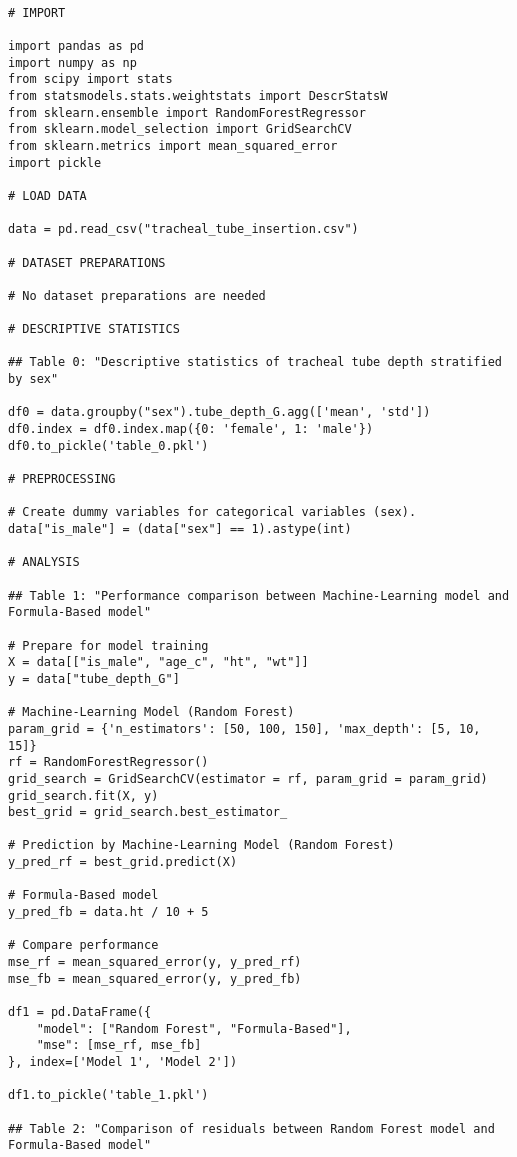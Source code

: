 \documentclass[11pt]{article}
\begin{document}
\begin{verbatim}

# IMPORT

import pandas as pd
import numpy as np
from scipy import stats
from statsmodels.stats.weightstats import DescrStatsW
from sklearn.ensemble import RandomForestRegressor
from sklearn.model_selection import GridSearchCV
from sklearn.metrics import mean_squared_error
import pickle

# LOAD DATA

data = pd.read_csv("tracheal_tube_insertion.csv")

# DATASET PREPARATIONS

# No dataset preparations are needed

# DESCRIPTIVE STATISTICS

## Table 0: "Descriptive statistics of tracheal tube depth stratified by sex"

df0 = data.groupby("sex").tube_depth_G.agg(['mean', 'std'])
df0.index = df0.index.map({0: 'female', 1: 'male'})
df0.to_pickle('table_0.pkl')

# PREPROCESSING

# Create dummy variables for categorical variables (sex).
data["is_male"] = (data["sex"] == 1).astype(int)

# ANALYSIS

## Table 1: "Performance comparison between Machine-Learning model and Formula-Based model"

# Prepare for model training
X = data[["is_male", "age_c", "ht", "wt"]]
y = data["tube_depth_G"]

# Machine-Learning Model (Random Forest)
param_grid = {'n_estimators': [50, 100, 150], 'max_depth': [5, 10, 15]}
rf = RandomForestRegressor()
grid_search = GridSearchCV(estimator = rf, param_grid = param_grid)
grid_search.fit(X, y)
best_grid = grid_search.best_estimator_

# Prediction by Machine-Learning Model (Random Forest)
y_pred_rf = best_grid.predict(X)

# Formula-Based model
y_pred_fb = data.ht / 10 + 5 

# Compare performance
mse_rf = mean_squared_error(y, y_pred_rf)
mse_fb = mean_squared_error(y, y_pred_fb)

df1 = pd.DataFrame({
    "model": ["Random Forest", "Formula-Based"],
    "mse": [mse_rf, mse_fb]
}, index=['Model 1', 'Model 2'])

df1.to_pickle('table_1.pkl')

## Table 2: "Comparison of residuals between Random Forest model and Formula-Based model"


\end{verbatim}
\end{document}
